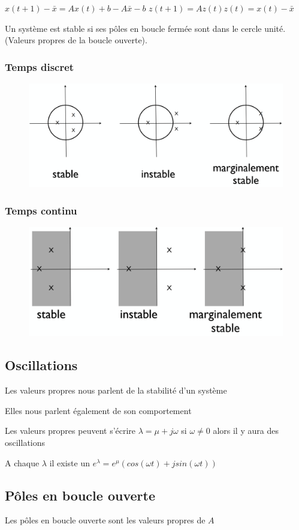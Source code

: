 \documentclass[resume]{subfiles}
\begin{document}
$x(t + 1)-\bar{x} = Ax(t) + b - A\bar{x}-b$
$z(t + 1) = Az(t) z(t) = x(t) - \bar{x}$ 

Un système est stable si ses pôles en boucle fermée sont dans le cercle unité. (Valeurs propres de la boucle ouverte).

\subsubsection{Temps discret}

\begin{figure}[H]
    \centering
    \includegraphics[width=0.8\columnwidth]{Figures/Stabilite_1.png}
\end{figure}

\subsubsection{Temps continu}

\begin{figure}[H]
    \centering
    \includegraphics[width=0.8\columnwidth]{Figures/Stabilite_2.png}
\end{figure}

\subsection{Oscillations}

Les valeurs propres nous parlent de la stabilité d'un système  

Elles nous parlent également de son comportement  

Les valeurs propres peuvent s'écrire $\lambda=\mu+j\omega$ si $\omega \neq 0$ alors il y aura des oscillations

A chaque $\lambda$ il existe un $e^{\lambda}=e^{\mu}(cos(\omega t)+jsin(\omega t))$

\subsection{Pôles en boucle ouverte}
Les pôles en boucle ouverte sont les valeurs propres de $A$
\end{document}
